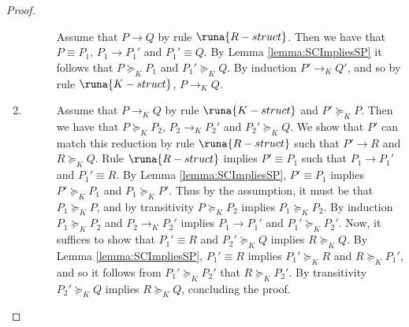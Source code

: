 \begin{lemma}
\begin{proof}
\begin{enumerate}
\begin{description}
        \item[] Assume that $P \longrightarrow Q$ by rule $\runa{R-struct}$. Then we have that $P \equiv P_1$, $P_1 \longrightarrow P_1'$ and $P_1' \equiv Q$. By Lemma \ref{lemma:SCImpliesSP} it follows that $P \succeq_K P_1$ and $P_1' \succeq_K Q$. By induction $P' \longrightarrow_K Q'$, and so by rule $\runa{K-struct}$, $P \longrightarrow_K Q$.
        
        
    \end{description} 
    
    \item
    \begin{description}
        \item[] Assume that $P \longrightarrow_K Q$ by rule $\runa{K-struct}$ and $P' \succeq_K P$. Then we have that $P \succeq_K P_2$, $P_2 \longrightarrow_K P_2'$ and $P_2' \succeq_K Q$. We show that $P'$ can match this reduction by rule $\runa{R-struct}$ such that $P' \longrightarrow R$ and $R \succeq_K Q$. Rule $\runa{R-struct}$ implies $P' \equiv P_1$ such that $P_1 \longrightarrow P_1'$ and $P_1' \equiv R$. By Lemma \ref{lemma:SCImpliesSP}, $P' \equiv P_1$ implies $P' \succeq_K P_1$ and $P_1 \succeq_K P'$. Thus by the assumption, it must be that $P_1 \succeq_K P$, and by transitivity $P \succeq_K P_2$ implies $P_1 \succeq_K P_2$. By induction $P_1 \succeq_K P_2$ and $P_2 \longrightarrow_K P_2'$ implies $P_1 \longrightarrow P_1'$ and $P_1' \succeq_K P_2'$. Now, it suffices to show that $P_1' \equiv R$ and $P_2' \succeq_K Q$ implies $R \succeq_K Q$. By Lemma \ref{lemma:SCImpliesSP}, $P_1' \equiv R$ implies $P_1' \succeq_K R$ and $R \succeq_K P_1'$, and so it follows from $P_1' \succeq_K P_2'$ that $R \succeq_K P_2'$. By transitivity $P_2' \succeq_K Q$ implies $R \succeq_K Q$, concluding the proof.
        

\end{description}
\end{enumerate}
\end{proof}
\end{lemma}

